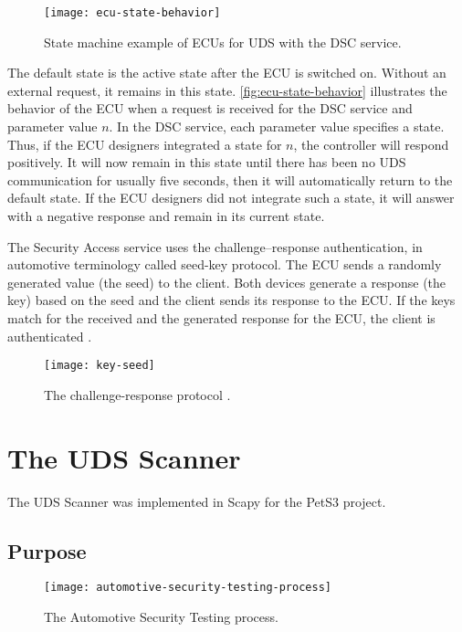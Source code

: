 \begin{figure}[htb]
    \centering
    \texttt{[image: ecu-state-behavior]}
    \caption{State machine example of ECUs for UDS with the DSC service.}
    \label{fig:ecu-state-behavior}
\end{figure}

The default state is the active state after the ECU is switched on. Without an external request, it remains in this state. \autoref{fig:ecu-state-behavior} illustrates the behavior of the ECU when a request is received for the DSC service and parameter value $n$. In the DSC service, each parameter value specifies a state. Thus, if the ECU designers integrated a state for $n$, the controller will respond positively. It will now remain in this state until there has been no UDS communication for usually five seconds, then it will automatically return to the default state. If the ECU designers did not integrate such a state, it will answer with a negative response and remain in its current state.

The Security Access service uses the challenge–response authentication, in automotive terminology called seed-key protocol. The ECU sends a randomly generated value (the seed) to the client. Both devices generate a response (the key) based on the seed and the client sends its response to the ECU. If the keys match for the received and the generated response for the ECU, the client is authenticated \cite{iso14229}.

\begin{figure}[htb]
    \centering
    \texttt{[image: key-seed]}
    \caption{The challenge-response protocol \cite{Herrewegen2018}.}
    \label{fig:key-seed}
\end{figure}


\section{The UDS Scanner}

The UDS Scanner was implemented in Scapy for the PetS3 project.

\subsection{Purpose}

\begin{figure}[htb]
    \centering
    \texttt{[image: automotive-security-testing-process]}
    \caption{The Automotive Security Testing process.}
    \label{fig:automotive-security-testing-process}
\end{figure}

